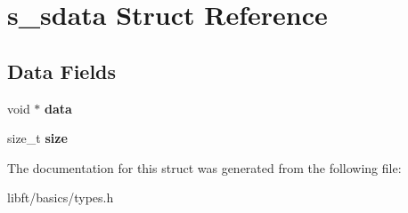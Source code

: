 \hypertarget{structs__sdata}{}\section{s\+\_\+sdata Struct Reference}
\label{structs__sdata}
\subsection*{Data Fields}
\begin{DoxyCompactItemize}
\item 
\hypertarget{structs__sdata_a735984d41155bc1032e09bece8f8d66d}{}void $\ast$ {\bfseries data}\label{structs__sdata_a735984d41155bc1032e09bece8f8d66d}

\item 
\hypertarget{structs__sdata_a854352f53b148adc24983a58a1866d66}{}size\+\_\+t {\bfseries size}\label{structs__sdata_a854352f53b148adc24983a58a1866d66}

\end{DoxyCompactItemize}


The documentation for this struct was generated from the following file\+:\begin{DoxyCompactItemize}
\item 
libft/basics/types.\+h\end{DoxyCompactItemize}
